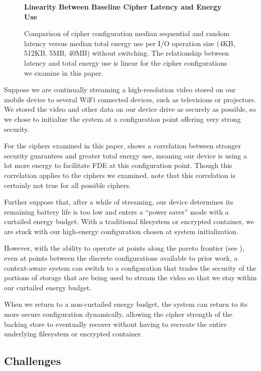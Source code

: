 \begin{figure}[ht] \textbf{Linearity Between Baseline Cipher Latency and Energy
Use}\par\medskip
   \centering
   {} \caption{Comparison of cipher
   configuration median sequential and random latency versus median total energy
   use per I/O operation size (4KB, 512KB, 5MB, 40MB) without switching. The
   relationship between latency and total energy use is linear for the cipher
   configurations we examine in this paper.}
  \label{fig:linearity-latency-energy}
\end{figure}

Suppose we are continually streaming a high-resolution video stored on our
mobile device to several WiFi connected devices, such as televisions or
projectors. We stored the video and other data on our device drive as securely
as possible, so we chose to initialize the system at a configuration point
offering very strong security.

For the ciphers examined in this paper,  shows
a correlation between stronger security guarantees and greater total energy use,
meaning our device is using a lot more energy to facilitate FDE at this
configuration point. Though this correlation applies to the ciphers we examined,
note that this correlation is certainly not true for all possible ciphers.

Further suppose that, after a while of streaming, our device determines its
remaining battery life is too low and enters a ``power saver'' mode with a
curtailed energy budget. With a traditional filesystem or encrypted container,
we are stuck with our high-energy configuration chosen at system initialization.

However, with the ability to operate at points along the pareto frontier (see
), even at points between the discrete configurations
available to prior work, a context-aware system can switch to a configuration
that trades the security of the portions of storage that are being used to
stream the video so that we stay within our curtailed energy budget.

When we return to a non-curtailed energy budget, the system can return to its
more secure configuration dynamically, allowing the cipher strength of the
backing store to eventually recover without having to recreate the entire
underlying filesystem or encrypted container.

\subsection{Challenges}

